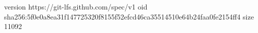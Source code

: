 version https://git-lfs.github.com/spec/v1
oid sha256:5f0e0a8ea31f147725320f8155f52efcd46ca35514510e64b24faa0fe2154ff4
size 11092
